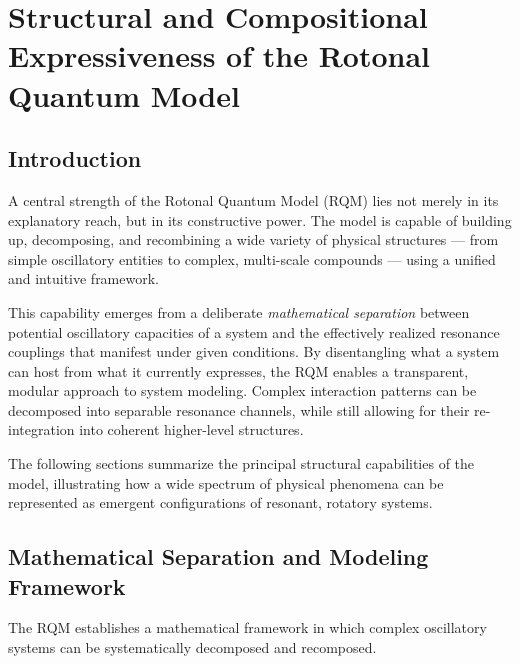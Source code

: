 \documentclass[11pt,a4paper]{article}
\begin{document}


 
 


\section{Structural and Compositional Expressiveness of the Rotonal Quantum Model}
\label{ch:rqm-expressiveness}

\subsection{Introduction}

A central strength of the Rotonal Quantum Model (RQM) lies not merely in its explanatory reach, but in its constructive power. The model is capable of building up, decomposing, and recombining a wide variety of physical structures --- from simple oscillatory entities to complex, multi-scale compounds --- using a unified and intuitive framework.

This capability emerges from a deliberate \emph{mathematical separation} between potential oscillatory capacities of a system and the effectively realized resonance couplings that manifest under given conditions. By disentangling what a system can host from what it currently expresses, the RQM enables a transparent, modular approach to system modeling. Complex interaction patterns can be decomposed into separable resonance channels, while still allowing for their re-integration into coherent higher-level structures.

The following sections summarize the principal structural capabilities of the model, illustrating how a wide spectrum of physical phenomena can be represented as emergent configurations of resonant, rotatory systems.

\subsection{Mathematical Separation and Modeling Framework}

The RQM establishes a mathematical framework in which complex oscillatory systems can be systematically decomposed and recomposed.
\end{document}
